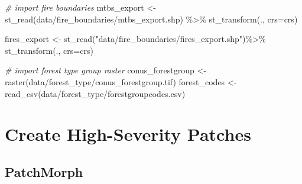 \documentclass[
]{book}
\newenvironment{Shaded}{\begin{snugshade}}{\end{snugshade}}
\newcommand{\AttributeTok}[1]{\textcolor[rgb]{0.77,0.63,0.00}{#1}}
\newcommand{\CommentTok}[1]{\textcolor[rgb]{0.56,0.35,0.01}{\textit{#1}}}
\newcommand{\FunctionTok}[1]{\textcolor[rgb]{0.00,0.00,0.00}{#1}}
\newcommand{\NormalTok}[1]{#1}
\newcommand{\OtherTok}[1]{\textcolor[rgb]{0.56,0.35,0.01}{#1}}
\newcommand{\SpecialCharTok}[1]{\textcolor[rgb]{0.00,0.00,0.00}{#1}}
\newcommand{\StringTok}[1]{\textcolor[rgb]{0.31,0.60,0.02}{#1}}
\begin{document}
\begin{Shaded}
\begin{Highlighting}[]
\CommentTok{\# import fire boundaries}
\NormalTok{mtbs\_export }\OtherTok{\textless{}{-}} \FunctionTok{st\_read}\NormalTok{(}\StringTok{\textquotesingle{}data/fire\_boundaries/mtbs\_export.shp\textquotesingle{}}\NormalTok{) }\SpecialCharTok{\%\textgreater{}\%} 
  \FunctionTok{st\_transform}\NormalTok{(., }\AttributeTok{crs=}\NormalTok{crs) }

\NormalTok{fires\_export }\OtherTok{\textless{}{-}} \FunctionTok{st\_read}\NormalTok{(}\StringTok{"data/fire\_boundaries/fires\_export.shp"}\NormalTok{)}\SpecialCharTok{\%\textgreater{}\%} 
  \FunctionTok{st\_transform}\NormalTok{(., }\AttributeTok{crs=}\NormalTok{crs)}

\CommentTok{\# import forest type group raster}
\NormalTok{conus\_forestgroup }\OtherTok{\textless{}{-}} \FunctionTok{raster}\NormalTok{(}\StringTok{\textquotesingle{}data/forest\_type/conus\_forestgroup.tif\textquotesingle{}}\NormalTok{)}
\NormalTok{forest\_codes }\OtherTok{\textless{}{-}} \FunctionTok{read\_csv}\NormalTok{(}\StringTok{\textquotesingle{}data/forest\_type/forestgroupcodes.csv\textquotesingle{}}\NormalTok{)}
\end{Highlighting}
\end{Shaded}

\hypertarget{create-high-severity-patches}{%
\chapter{Create High-Severity Patches}\label{create-high-severity-patches}}

\hypertarget{patchmorph}{%
\section{PatchMorph}\label{patchmorph}}
\end{document}
